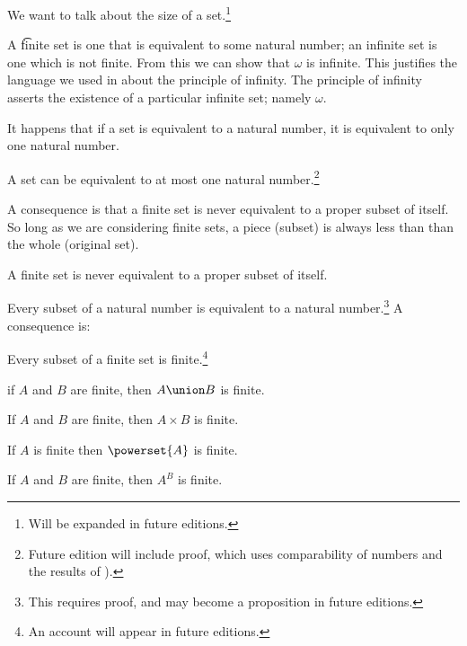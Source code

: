 

We want to talk about the size of a set.\footnote{Will be expanded in future editions.}


A \t{finite} set is one that is equivalent to some natural number; an infinite set is one which is not finite.
From this we can show that $\omega$ is infinite.
This justifies the language we used in  about the principle of infinity.
The principle of infinity asserts the existence of a particular infinite set; namely $\omega$.


It happens that if a set is equivalent to a natural number, it is equivalent to only one natural number.

\begin{proposition}
	A set can be equivalent to at most one natural number.\footnote{Future edition will include proof, which uses comparability of numbers and the results of ).}
\end{proposition}
A consequence is that a finite set is never equivalent to a proper subset of itself.
So long as we are considering finite sets, a piece (subset) is always less than than the whole (original set).
\begin{proposition}
	A finite set is never equivalent to a proper subset of itself.
\end{proposition}


Every subset of a natural number is equivalent to a natural number.\footnote{This requires proof, and may become a proposition in future editions.}
A consequence is:

\begin{proposition}
	Every subset of a finite set is finite.\footnote{An account will appear in future editions.}
\end{proposition}


\begin{proposition}
	if $A$ and $B$ are finite, then $A \union B$ is finite.
\end{proposition}


\begin{proposition}
	If $A$ and $B$ are finite, then $A \times B$ is finite.
\end{proposition}



\begin{proposition}
	If $A$ is finite then $\powerset{A}$ is finite.
\end{proposition}


\begin{proposition}
	If $A$ and $B$ are finite, then $A^B$ is finite.
\end{proposition}

